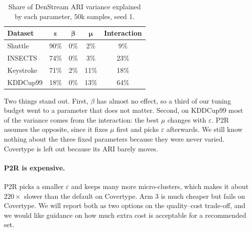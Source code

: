 \begin{table}[H]
\centering
\caption{Share of DenStream ARI variance explained by each parameter, 50k samples, seed 1.}
\label{tab:importance}
\small
\begin{tabular}{@{}l c c c c@{}}
\toprule
\textbf{Dataset} & $\boldsymbol{\varepsilon}$ & $\boldsymbol{\beta}$ & $\boldsymbol{\mu}$ & \textbf{Interaction} \\
\midrule
Shuttle   & 90\% & 0\% & 2\%  & 9\%  \\
INSECTS   & 74\% & 0\% & 3\%  & 23\% \\
Keystroke & 71\% & 2\% & 11\% & 18\% \\
KDDCup99  & 18\% & 0\% & 13\% & 64\% \\
\bottomrule
\end{tabular}
\end{table}

Two things stand out. First, $\beta$ has almost no effect, so a third of our tuning budget went to a parameter that does not matter. Second, on KDDCup99 most of the variance comes from the interaction: the best $\mu$ changes with $\varepsilon$. P2R assumes the opposite, since it fixes $\mu$ first and picks $\varepsilon$ afterwards. We still know nothing about the three fixed parameters because they were never varied. Covertype is left out because its ARI barely moves.

\paragraph{P2R is expensive.}
P2R picks a smaller $\varepsilon$ and keeps many more micro-clusters, which makes it about $220\times$ slower than the default on Covertype. Arm 3 is much cheaper but fails on Covertype. We will report both as two options on the quality--cost trade-off, and we would like guidance on how much extra cost is acceptable for a recommended set.

